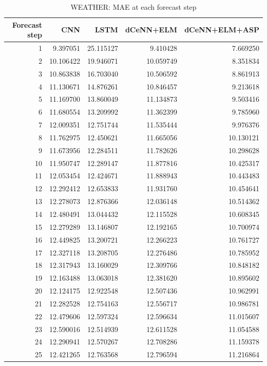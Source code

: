\begin{table}
\caption{WEATHER: MAE at each forecast step}
\begin{tabular}{rrrrr}
\toprule
Forecast step & CNN & LSTM & dCeNN+ELM & dCeNN+ELM+ASP \\
\midrule
1 & 9.397051 & 25.115127 & 9.410428 & 7.669250 \\
2 & 10.106422 & 19.946071 & 10.059749 & 8.351834 \\
3 & 10.863838 & 16.703040 & 10.506592 & 8.861913 \\
4 & 11.130671 & 14.876261 & 10.846457 & 9.213618 \\
5 & 11.169700 & 13.860049 & 11.134873 & 9.503416 \\
6 & 11.680554 & 13.209992 & 11.362399 & 9.785960 \\
7 & 12.009351 & 12.751744 & 11.535444 & 9.976376 \\
8 & 11.762975 & 12.450621 & 11.665056 & 10.130121 \\
9 & 11.673956 & 12.284511 & 11.782626 & 10.298628 \\
10 & 11.950747 & 12.289147 & 11.877816 & 10.425317 \\
11 & 12.053454 & 12.424671 & 11.888943 & 10.443483 \\
12 & 12.292412 & 12.653833 & 11.931760 & 10.454641 \\
13 & 12.278073 & 12.876366 & 12.036148 & 10.514362 \\
14 & 12.480491 & 13.044432 & 12.115528 & 10.608345 \\
15 & 12.279289 & 13.146807 & 12.192165 & 10.700974 \\
16 & 12.449825 & 13.200721 & 12.266223 & 10.761727 \\
17 & 12.327118 & 13.208705 & 12.276486 & 10.785952 \\
18 & 12.317943 & 13.160029 & 12.309766 & 10.848182 \\
19 & 12.163488 & 13.063018 & 12.381620 & 10.895602 \\
20 & 12.124175 & 12.922548 & 12.507436 & 10.962991 \\
21 & 12.282528 & 12.754163 & 12.556717 & 10.986781 \\
22 & 12.479606 & 12.597324 & 12.596634 & 11.015607 \\
23 & 12.590016 & 12.514939 & 12.611528 & 11.054588 \\
24 & 12.290941 & 12.570267 & 12.708286 & 11.159378 \\
25 & 12.421265 & 12.763568 & 12.796594 & 11.216864 \\

\end{tabular}
\end{table}
